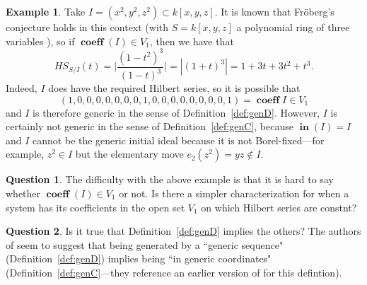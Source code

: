 \documentclass[11pt]{article}
\DeclareMathOperator{\Init}{\mathbf{in}}
\DeclareMathOperator{\coeff}{\textbf{coeff}}
\theoremstyle{definition}
\newtheorem{example}{Example}
\newtheorem{question}{Question}
\begin{document}
\begin{example}\label{maybecounterex}
	Take $I = (x^2, y^2, z^2) \subset k[x,y,z]$. It is known that Fröberg's conjecture holds in this context (with $S = k[x,y,z]$ a polynomial ring of three variables \cite{TRUNG201979}), so if $\coeff(I) \in V_1$, then we have that \[ HS_{S/I} (t) = \bigg| \frac{(1 - t^2)^3}{(1 - t)^3} \bigg| = |(1 + t)^3| = 1 + 3t + 3t^2 + t^3. \] Indeed, $I$ does have the required Hilbert series, so it is possible that \[ (1,0,0,0,0,0,0,0,1,0,0,0,0,0,0,0,0,1) = \coeff I \in V_1 \] and $I$ is therefore generic in the sense of Definition~\ref{def:genD}. However, $I$ is certainly not generic in the sense of Definition~\ref{def:genC}, because $\Init(I) = I$ and $I$ cannot be the generic initial ideal because it is not Borel-fixed---for example, $z^2 \in I$ but the elementary move $e_2(z^2) = yz \notin I$. 
\end{example}

\color{red}

\begin{question}
	\color{black} The difficulty with the above example is that it is hard to say whether $\coeff(I) \in V_1$ or not. Is there a simpler characterization for when a system has its coefficients in the open set $V_1$ on which Hilbert series are constnt?
\end{question} 

\begin{question}
	\color{black} Is it true that Definition~\ref{def:genD} implies the others? The authors of \cite{bigdeli2021semi} seem to suggest that being generated by a ``generic sequence" (Definition~\ref{def:genD}) implies being ``in generic coordinates" (Definition~\ref{def:genC}---they reference an earlier version of \cite{caminata2020solving} for this defintion). 
\end{question}

\color{black}




\nocite{atiyah1969introduction}
\nocite{M2}
\nocite{sage}

\newpage


\end{document}
